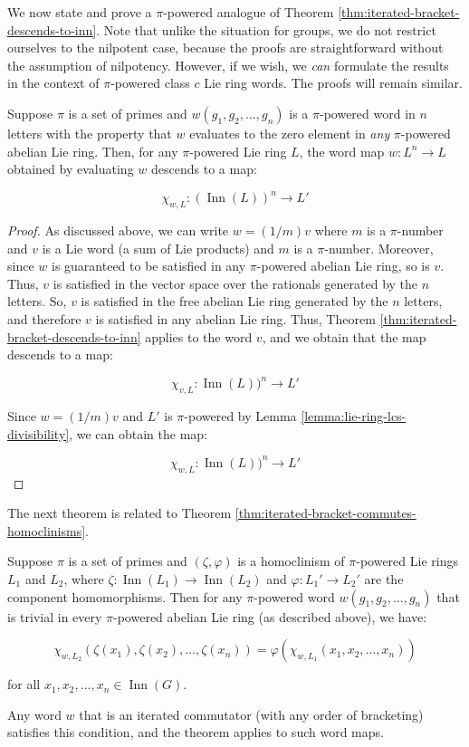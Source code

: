 \documentclass{ucetd}
\begin{document}
We now state and prove a $\pi$-powered analogue of Theorem
\ref{thm:iterated-bracket-descends-to-inn}. Note that unlike the
situation for groups, we do not restrict ourselves to the nilpotent
case, because the proofs are straightforward without the assumption of
nilpotency. However, if we wish, we {\em can} formulate the results in
the context of $\pi$-powered class $c$ Lie ring words. The proofs will
remain similar.

\begin{theorem}\label{thm:iterated-bracket-descends-to-inn-pi-powered}
  Suppose $\pi$ is a set of primes and $w(g_1,g_2,\dots,g_n)$ is a
  $\pi$-powered word in $n$ letters with the property that $w$
  evaluates to the zero element in {\em any} $\pi$-powered abelian Lie
  ring. Then, for any $\pi$-powered Lie ring $L$, the word map $w:L^n
  \to L$ obtained by evaluating $w$ descends to a map:

  $$\chi_{w,L}: (\operatorname{Inn}(L))^n  \to L'$$
\end{theorem}

\begin{proof}
  As discussed above, we can write $w = (1/m)v$ where $m$ is a
  $\pi$-number and $v$ is a Lie word (a sum of Lie products) and $m$
  is a $\pi$-number. Moreover, since $w$ is guaranteed to be satisfied
  in any $\pi$-powered abelian Lie ring, so is $v$. Thus, $v$ is
  satisfied in the vector space over the rationals generated by the
  $n$ letters. So, $v$ is satisfied in the free abelian Lie ring
  generated by the $n$ letters, and therefore $v$ is satisfied in any
  abelian Lie ring. Thus, Theorem
  \ref{thm:iterated-bracket-descends-to-inn} applies to the word
  $v$, and we obtain that the map descends to a map:

  $$\chi_{v,L}: \operatorname{Inn}(L))^n \to L'$$

  Since $w = (1/m)v$ and $L'$ is $\pi$-powered by Lemma
  \ref{lemma:lie-ring-lcs-divisibility}, we can obtain the map:

  $$\chi_{w,L}: \operatorname{Inn}(L))^n \to L'$$
\end{proof}

The next theorem is related to Theorem \ref{thm:iterated-bracket-commutes-homoclinisms}.

\begin{theorem}\label{thm:iterated-bracket-commutes-homoclinisms-pi-powered}
  Suppose $\pi$ is a set of primes and $(\zeta,\varphi)$ is a
  homoclinism of $\pi$-powered Lie rings $L_1$ and $L_2$, where
  $\zeta:\operatorname{Inn}(L_1) \to \operatorname{Inn}(L_2)$ and
  $\varphi:L_1' \to L_2'$ are the component homomorphisms. Then for
  any $\pi$-powered word $w(g_1,g_2,\dots,g_n)$ that is trivial
  in every $\pi$-powered abelian Lie ring (as described above), we have:

  $$\chi_{w,L_2}(\zeta(x_1),\zeta(x_2),\dots,\zeta(x_n)) = \varphi(\chi_{w,L_1}(x_1,x_2,\dots,x_n))$$

  for all $x_1,x_2,\dots,x_n \in \operatorname{Inn}(G)$.

  Any word $w$ that is an iterated commutator (with any order of
  bracketing) satisfies this condition, and the theorem applies to
  such word maps.
\end{theorem}
\end{document}
